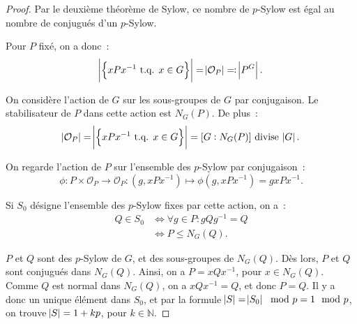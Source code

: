 \documentclass{article}
\theoremstyle{definition}
\theoremstyle{remark}
\newcommand{\N}{\mathbb N}
\newcommand{\tq}{\text{ t.q. }}
\begin{document}
	\begin{proof} Par le deuxième théorème de Sylow, ce nombre de $p$-Sylow est égal au nombre de conjugués d'un $p$-Sylow.

	Pour $P$ fixé, on a donc~:
	\[\abs {\left\{xPx^{-1} \tq x \in G\right\}} = \abs {\mathcal O_P} \eqqcolon \abs {P^G}.\]

	On considère l'action de $G$ sur les sous-groupes de $G$ par conjugaison. Le stabilisateur de $P$ dans cette action est $N_G(P)$.
	De plus~:
	\[\abs {\mathcal O_P} = \abs {\left\{xPx^{-1} \tq x \in G\right\}} = [G:N_G(P)] \text{ divise } \abs G.\]

	On regarde l'action de $P$ sur l'ensemble des $p$-Sylow par conjugaison~:
	\[\phi : P \times \mathcal O_P \to \mathcal O_P : (g, xPx^{-1}) \mapsto \phi(g, xPx^{-1}) = gxPx^{-1}.\]

	Si $S_0$ désigne l'ensemble des $p$-Sylow fixes par cette action, on a~:
	\begin{align*}
		Q \in S_0 &\iff \forall g \in P : gQg^{-1} = Q \\
		&\iff P \leq N_G(Q).
	\end{align*}

	$P$ et $Q$ sont des $p$-Sylow de $G$, et des sous-groupes de $N_G(Q)$. Dès lors, $P$ et $Q$ sont conjugués dans $N_G(Q)$. Ainsi, on a
	$P = xQx^{-1}$, pour $x \in N_G(Q)$. Comme $Q$ est normal dans $N_G(Q)$, on a $xQx^{-1} = Q$, et donc $P=Q$. Il y a donc un unique élément dans $S_0$, et
	par la formule $\abs S = \abs {S_0} \mod p = 1 \mod p$, on trouve $\abs S = 1 + kp$, pour $k \in \N$.
	\end{proof}
\end{document}
